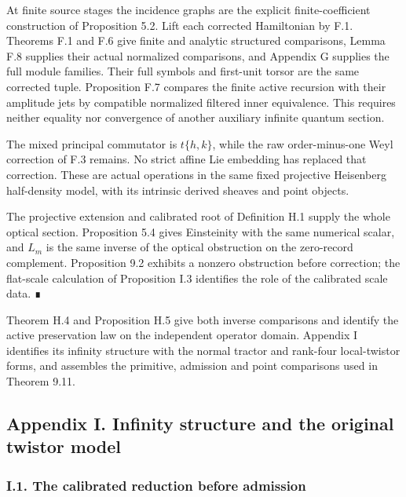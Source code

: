 \documentclass[
  english,
  11pt,
  reqno]{amsart}
\begin{document}
At finite source stages the incidence graphs are the explicit
finite-coefficient construction of Proposition 5.2. Lift each corrected
Hamiltonian by F.1. Theorems F.1 and F.6 give finite and analytic
structured comparisons, Lemma F.8 supplies their actual normalized
comparisons, and Appendix G supplies the full module families. Their
full symbols and first-unit torsor are the same corrected tuple.
Proposition F.7 compares the finite active recursion with their
amplitude jets by compatible normalized filtered inner equivalence. This
requires neither equality nor convergence of another auxiliary infinite
quantum section.

The mixed principal commutator is \(t\{h,k\}\), while the raw
order-minus-one Weyl correction of F.3 remains. No strict affine Lie
embedding has replaced that correction. These are actual operations in
the same fixed projective Heisenberg half-density model, with its
intrinsic derived sheaves and point objects.

The projective extension and calibrated root of Definition H.1 supply
the whole optical section. Proposition 5.4 gives Einsteinity with the
same numerical scalar, and \(L_m\) is the same inverse of the optical
obstruction on the zero-record complement. Proposition 9.2 exhibits a
nonzero obstruction before correction; the flat-scale calculation of
Proposition I.3 identifies the role of the calibrated scale data. ∎

Theorem H.4 and Proposition H.5 give both inverse comparisons and
identify the active preservation law on the independent operator domain.
Appendix I identifies its infinity structure with the normal tractor and
rank-four local-twistor forms, and assembles the primitive, admission
and point comparisons used in Theorem 9.11.

\protect{}\label{app:gg-original-positive-comparison}

\subsection{Appendix I. Infinity structure and the original twistor
model}\label{appendix-i.-infinity-structure-and-the-original-twistor-model}

\protect{}\label{sec:gg-preadmission-reduction}

\subsubsection{I.1. The calibrated reduction before
admission}\label{i.1.-the-calibrated-reduction-before-admission}
\end{document}
